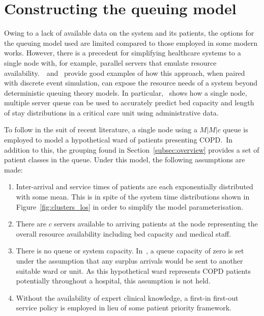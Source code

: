 \section{Constructing the queuing model}\label{sec:model}


Owing to a lack of available data on the system and its patients, the options
for the queuing model used are limited compared to those employed in some modern
works. However, there is a precedent for simplifying healthcare systems to a
single node with, for example, parallel servers that emulate resource
availability.~\cite{Steins2013}~and~\cite{Williams2015} provide good examples
of how this approach, when paired with discrete event simulation, can expose the
resource needs of a system beyond deterministic queuing theory models. In
particular,~\cite{Williams2015} shows how a single node, multiple server
queue can be used to accurately predict bed capacity and length of stay
distributions in a critical care unit using administrative data.

To follow in the suit of recent literature, a single node using a \(M|M|c\)
queue is employed to model a hypothetical ward of patients presenting COPD.\ In
addition to this, the grouping found in Section~\ref{subsec:overview} provides
a set of patient classes in the queue. Under this model, the following
assumptions are made:
\begin{enumerate}
    \item Inter-arrival and service times of patients are each exponentially
        distributed with some mean. This is in spite of the system time
        distributions shown in Figure~\ref{fig:clusters_los} in order to
        simplify the model parameterisation.
    \item There are \(c\) servers available to arriving patients at the node
        representing the overall resource availability including bed capacity
        and medical staff.
    \item There is no queue or system capacity. In~\cite{Williams2015}, a
        queue capacity of zero is set under the assumption that any surplus
        arrivals would be sent to another suitable ward or unit. As this
        hypothetical ward represents COPD patients potentially throughout a
        hospital, this assumption is not held.
    \item Without the availability of expert clinical knowledge, a first-in
        first-out service policy is employed in lieu of some patient priority 
        framework.
\end{enumerate}

